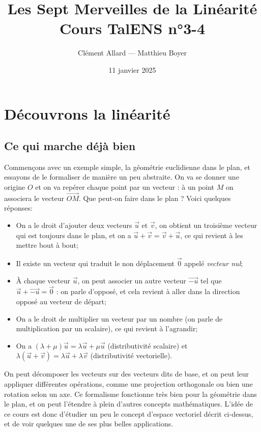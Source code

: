 \documentclass{classe}
\title{Les Sept Merveilles de la Linéarité\\ \small Cours TalENS n°3-4}
\author{Clément Allard --- Matthieu Boyer}
\date{11 janvier 2025}
\begin{document}
\section{Découvrons la linéarité}

\subsection{Ce qui marche déjà bien}

Commençons avec un exemple simple, la géométrie euclidienne dans le plan, et essayons de le formaliser de manière un peu abstraite. On va se donner une origine $O$ et on va repérer chaque point par un vecteur : à un point $M$ on associera le vecteur $\overrightarrow{OM}$. Que peut-on faire dans le plan ? Voici quelques réponses:

\begin{itemize}
	\item On a le droit d'ajouter deux vecteurs $\overrightarrow{u}$ et $\overrightarrow{v}$, on obtient un troisième vecteur qui est toujours dans le plan, et on a $\overrightarrow{u} + \overrightarrow{v} = \overrightarrow{v} + \overrightarrow{u}$, ce qui revient à les mettre bout à bout;
	\item Il existe un vecteur qui traduit le non déplacement $\overrightarrow{0}$ appelé \emph{vecteur nul};
	\item À chaque vecteur $\overrightarrow{u}$, on peut associer un autre vecteur $\overrightarrow{-u}$ tel que $\overrightarrow{u} + \overrightarrow{-u} = \overrightarrow{0}$ : on parle d'opposé, et cela revient à aller dans la direction opposé au vecteur de départ;
	\item On a le droit de multiplier un vecteur par un nombre (on parle de multiplication par un scalaire), ce qui revient à l'agrandir;
	\item On a $(\lambda + \mu)\overrightarrow{u} = \lambda\overrightarrow{u} + \mu\overrightarrow{u}$ (distributivité scalaire) et $\lambda(\overrightarrow{u}+\overrightarrow{v}) = \lambda\overrightarrow{u}+\lambda\overrightarrow{v}$ (distributivité vectorielle).
\end{itemize}

On peut décomposer les vecteurs sur des vecteurs dits de base, et on peut leur appliquer différentes opérations, comme une projection orthogonale ou bien une rotation selon un axe. Ce formalisme fonctionne très bien pour la géométrie dans le plan, et on peut l'étendre à plein d'autres concepts mathématiques.
L'idée de ce cours est donc d'étudier un peu le concept d'espace vectoriel décrit ci-dessus, et de voir quelques une de ses plus belles applications.
\end{document}
